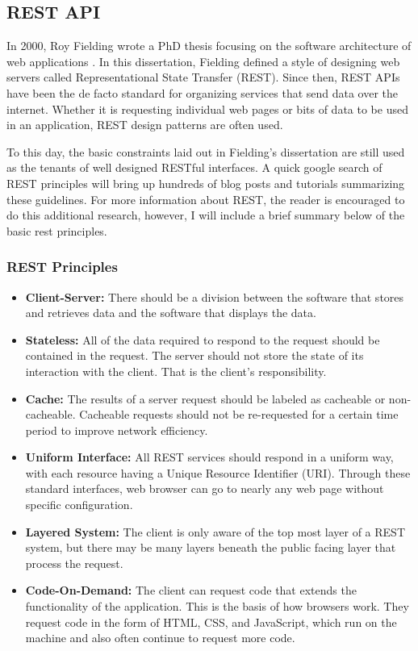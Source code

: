 \subsection{REST API}
In 2000, Roy Fielding wrote a PhD thesis focusing on the software architecture of web applications \cite{fieldingArchitecturalStylesDesign2000}.  In this dissertation, Fielding defined a style of designing web servers called Representational State Transfer (REST).  Since then, REST APIs have been the de facto standard for organizing services that send data over the internet.  Whether it is requesting individual web pages or bits of data to be used in an application, REST design patterns are often used. 

To this day, the basic constraints laid out in Fielding's dissertation are still used as the tenants of well designed RESTful interfaces.  A quick google search of REST principles will bring up hundreds of blog posts and tutorials summarizing these guidelines. For more information about REST, the reader is encouraged to do this additional research, however, I will include a brief summary below of the basic rest principles.

\subsubsection{REST Principles}

\begin{itemize}
    \item \textbf{Client-Server:} There should be a division between the software that stores and retrieves data and the software that displays the data.
    \item \textbf{Stateless:} All of the data required to respond to the request should be contained in the request. The server should not store the state of its interaction with the client. That is the client's responsibility.
    \item \textbf{Cache:} The results of a server request should be labeled as cacheable or non-cacheable.  Cacheable requests should not be re-requested for a certain time period to improve network efficiency.
    \item \textbf{Uniform Interface:} All REST services should respond in a uniform way, with each resource having a Unique Resource Identifier (URI).  Through these standard interfaces, web browser can go to nearly any web page without specific configuration.
    \item \textbf{Layered System:} The client is only aware of the top most layer of a REST system, but there may be many layers beneath the public facing layer that process the request.
    \item \textbf{Code-On-Demand:} The client can request code that extends the functionality of the application.  This is the basis of how browsers work.  They request code in the form of HTML, CSS, and JavaScript, which run on the machine and also often continue to request more code.
\end{itemize}


